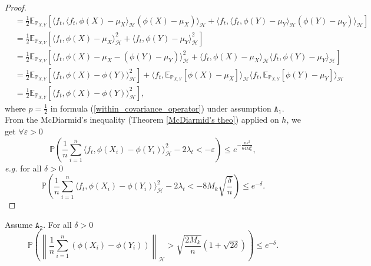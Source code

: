 \documentclass[twoside,11pt]{article}
\newcommand{\Hk}{\mathcal{H}}
\newcommand{\nb}{n}
\newcommand{\PP}{\mathbb{P}}%
\newcommand{\PPO}{\mathbb{P} }
\newcommand{\EE}{\mathbb{E}}%
\newcommand{\A}[1]{$\mathtt{A_#1}$}
\newcommand{\ti}[1]{\textit{#1}} %
\begin{document}
\begin{proof}
\begin{align*}
    & = \frac 12 \EE_{\PP_{X,Y}} \left [ \langle f_t,  \langle f_t, \phi(X) - \mu_X  \rangle_{\Hk} \left( \phi(X) - \mu_X  \right) \rangle_{\Hk} + \langle f_t,  \langle f_t, \phi(Y) - \mu_Y  \rangle_{\Hk} \left( \phi(Y) - \mu_Y \right) \rangle_{\Hk} \right ]  \\
    & = \frac 12 \EE_{\PP_{X,Y}} \left [ \langle f_t, \phi(X) - \mu_X  \rangle_{\Hk}^2 + \langle f_t, \phi(Y) - \mu_Y  \rangle_{\Hk}^2 \right ]  \\
    &= \frac 12 \EE_{\PP_{X,Y}} \left [ \langle f_t, \phi(X) - \mu_X - \left( \phi(Y) - \mu_Y \right) \rangle_{\Hk}^2 +   \langle f_t, \phi(X) - \mu_X \rangle_{\Hk} \langle f_t, \phi(Y) - \mu_Y \rangle_{\Hk}  \right ] \\
    & = \frac 12 \EE_{\PP_{X,Y}} \left [ \langle f_t, \phi(X) - \phi(Y) \rangle_{\Hk}^2  \right ] +   \langle f_t,\EE_{\PP_{X,Y}} \left [ \phi(X) - \mu_X  \right ] \rangle_{\Hk} \langle f_t, \EE_{\PP_{X,Y}} \left [ \phi(Y) - \mu_Y \right ]  \rangle_{\Hk} \\
    & = \frac 12 \EE_{\PP_{X,Y}} \left [ \langle f_t, \phi(X) - \phi(Y) \rangle_{\Hk}^2  \right ],
\end{align*}
where $p = \frac{1}{2}$ in formula (\ref{within_covariance_operator}) under assumption \A{1}. 
From the McDiarmid's inequality (Theorem \ref{McDiarmid's theo}) applied on $h$, we get $\forall \varepsilon >0$ 
\begin{equation*}
    \PPO \left(  \frac{1}{\nb} \underset{i=1}{\overset{\nb}{\sum}} \langle f_t, \phi(X_i) - \phi(Y_i)  \rangle_{\Hk}^2 - 2 \lambda_t < -\varepsilon  \right) \leq e^{- \frac{\nb \varepsilon^2}{64 M_k^2}},
\end{equation*}
\ti{e.g.} for all $\delta >0$ 
\begin{equation*}
    \PPO \left(  \frac{1}{\nb} \underset{i=1}{\overset{\nb}{\sum}} \langle f_t, \phi(X_i) - \phi(Y_i) \rangle_{\Hk}^2 - 2 \lambda_t < - 8 M_k \sqrt{\frac{\delta}{\nb}}  \right) \leq e^{- \delta}.
\end{equation*}
\end{proof}
\begin{lemma}
\label{lemma_norm_Z_bar}
Assume \A{2}. 
For all $\delta>0$ 
\begin{equation*}
    \PPO \left(  \left\| \frac{1}{\nb} \underset{i=1}{\overset{\nb}{\sum}} \left(\phi(X_i) - \phi(Y_i)\right) \right\|_{\Hk} > \sqrt{\frac{2 M_k}{\nb}} \left(1+\sqrt{2\delta}\right) \right) \leq e^{-\delta}.
\end{equation*}
\end{lemma}
\end{document}
